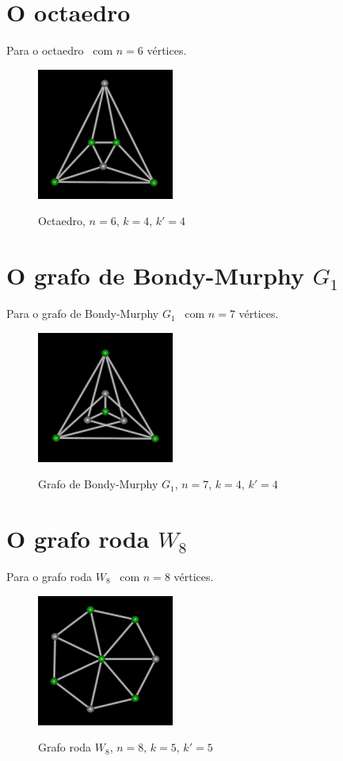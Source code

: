 \section{O octaedro}
Para o octaedro~\cite{cite:example-plato} com $n=6$ vértices.

\begin{figure}[htb]
\centering
\includegraphics[width=0.4\textwidth]{img/octaedro.png}
\label{fig:example-octaedro}
\caption{Octaedro, $n=6$, $k=4$, $k'=4$}
\end{figure}


\section{O grafo de Bondy-Murphy $G_1$}
Para o grafo de Bondy-Murphy $G_1$~\cite{cite:example-bondy} com $n=7$
vértices.

\begin{figure}[htb]
\centering
\includegraphics[width=0.4\textwidth]{img/bondymurphyg1.png}
\label{fig:example-bondymurphyg1}
\caption{Grafo de Bondy-Murphy $G_1$, $n=7$, $k=4$, $k'=4$}
\end{figure}


\section{O grafo roda $W_8$}
Para o grafo roda $W_8$~\cite{cite:example-bondy} com $n=8$ vértices.

\begin{figure}[htb]
\centering
\includegraphics[width=0.4\textwidth]{img/wheel.png}
\label{fig:example-wheel}
\caption{Grafo roda $W_8$, $n=8$, $k=5$, $k'=5$}
\end{figure}


